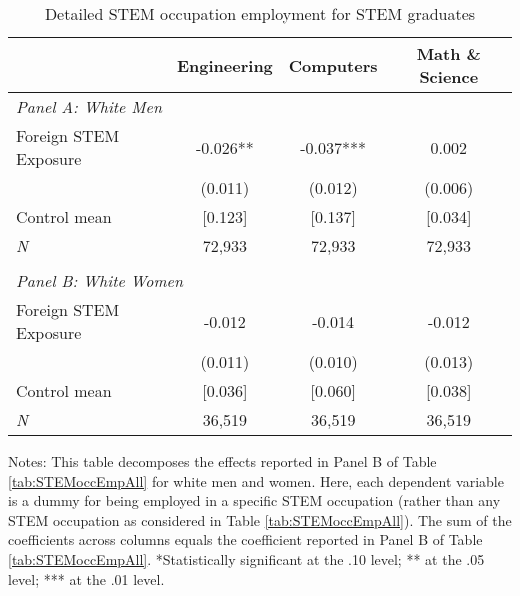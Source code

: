 \begin{table}[ht]
\caption{Detailed STEM occupation employment for STEM graduates}
\label{tab:TA9a}
\centering
\begin{threeparttable}
\begin{tabular}{lccc}
\toprule 
 & Engineering  & Computers & Math \& Science \\
\midrule 
\multicolumn{4}{l}{\emph{Panel A: White Men}}\\ 
Foreign STEM Exposure & -0.026** & -0.037*** & 0.002  \\ 
 &  (0.011)        & (0.012)        & (0.006) \\ 
Control mean &  [0.123]       & [0.137]       & [0.034] \\ 
\emph{N} &     72,933          &    72,933          &    72,933 \\ 
                         &                              &                              &\\
\multicolumn{4}{l}{\emph{Panel B: White Women}}\\ 
Foreign STEM Exposure & -0.012  & -0.014  & -0.012  \\ 
 &  (0.011)        & (0.010)        & (0.013) \\ 
Control mean &  [0.036]       & [0.060]       & [0.038] \\ 
\emph{N} &     36,519          &    36,519          &    36,519 \\ 
\bottomrule 
\end{tabular} 
\footnotesize Notes: This table decomposes the effects reported in Panel B of Table \ref{tab:STEMoccEmpAll} for white men and women. Here, each dependent variable is a dummy for being employed in a specific STEM occupation (rather than any STEM occupation as considered in Table \ref{tab:STEMoccEmpAll}). The sum of the coefficients across columns equals the coefficient reported in Panel B of Table \ref{tab:STEMoccEmpAll}. *Statistically significant at the .10 level; ** at the .05 level; *** at the .01 level.
\end{threeparttable} 
\end{table} 
